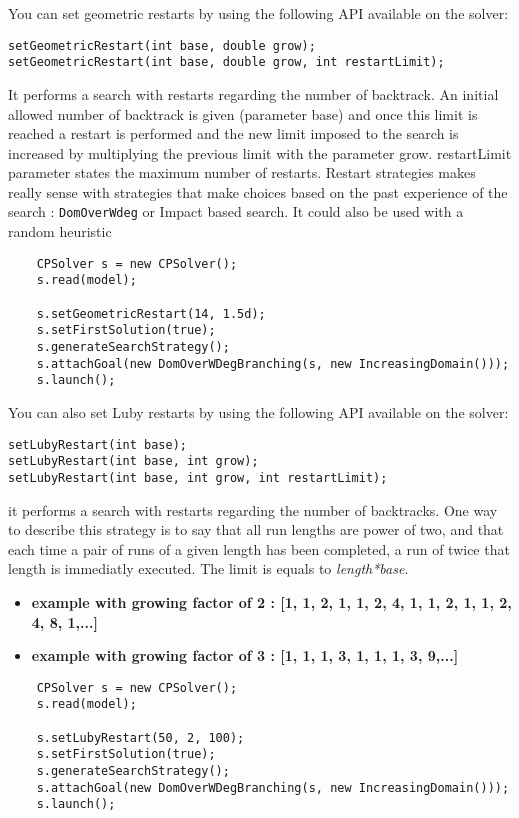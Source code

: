 You can set geometric restarts by using the following API available on the solver:
\begin{lstlisting}
setGeometricRestart(int base, double grow);
setGeometricRestart(int base, double grow, int restartLimit);
\end{lstlisting}
It performs a search with restarts regarding the number of backtrack. An initial allowed number of backtrack is given (parameter base) and once this limit is reached a restart is performed and the new limit imposed to the search is increased by multiplying the previous limit with the parameter grow. restartLimit parameter states the maximum number of restarts. Restart strategies makes really sense with strategies that make choices based on the past experience of the search : \texttt{DomOverWdeg} or Impact based search. It could also be used with a random heuristic
\begin{lstlisting}
	CPSolver s = new CPSolver();
	s.read(model);
	
	s.setGeometricRestart(14, 1.5d);
	s.setFirstSolution(true);
	s.generateSearchStrategy();
	s.attachGoal(new DomOverWDegBranching(s, new IncreasingDomain()));
	s.launch();
\end{lstlisting}

You can also set Luby restarts by using the following API available on the solver:
\begin{lstlisting}
setLubyRestart(int base);
setLubyRestart(int base, int grow);
setLubyRestart(int base, int grow, int restartLimit);
\end{lstlisting}
it performs a search with restarts regarding the number of backtracks. One way to describe this strategy is to say that all run lengths are power of two, and that each time a pair of runs of a given length has been completed, a run of twice that length is immediatly executed. The limit is equals to \emph{length*base}.
\begin{itemize}
	\item \textbf{example with growing factor of 2 : [1, 1, 2, 1, 1, 2, 4, 1, 1, 2, 1, 1, 2, 4, 8, 1,...]}
	\item \textbf{example with growing factor of 3 : [1, 1, 1, 3, 1, 1, 1, 3, 9,...]}
\end{itemize}

\begin{lstlisting}
	CPSolver s = new CPSolver();
	s.read(model);
	
	s.setLubyRestart(50, 2, 100);
	s.setFirstSolution(true);
	s.generateSearchStrategy();
	s.attachGoal(new DomOverWDegBranching(s, new IncreasingDomain()));
	s.launch();
\end{lstlisting}

